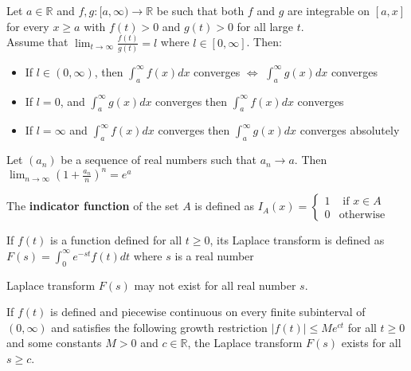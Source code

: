 \begin{prop}
    Let $a \in \mathbb{R}$ and $f,g: [a, \infty) \to \mathbb{R}$ be such that both $f$ and $g$ are integrable on $[a,x]$ for every $x \geq a$ with $f(t) > 0$ and $g(t) > 0$ for all large $t$. \\ Assume that
    $\displaystyle \lim_{t \to \infty} \frac{f(t)}{g(t)} = l$ where $l \in [0, \infty]$. Then:
    \begin{itemize}
        \item If $l \in (0, \infty)$, then $\int_a^\infty f(x)dx$ converges $\iff$ $\int_a^\infty g(x)dx$ converges
        \item If $l = 0$, and $\int_a^\infty g(x)dx$ converges then $\int_a^\infty f(x)dx$ converges
        \item If $l = \infty$ and $\int_a^\infty f(x)dx$ converges then $\int_a^\infty g(x)dx$ converges absolutely
    \end{itemize}
\end{prop}

\begin{prop}
    Let $(a_n)$ be a sequence of real numbers such that $a_n \to a$. Then $\lim_{n \to \infty} \left( 1 + \frac{a_n}{n} \right)^n = e^a$ 
\end{prop}

\begin{defn}
    The \textbf{indicator function} of the set $A$ is defined as $I_A (x) = \begin{cases} 1 & \text{ if } x \in A \\ 0 & \text{otherwise} \end{cases}$

\end{defn}

\begin{defn}
    If $f(t)$ is a function defined for all $t \geq 0$, its Laplace transform is defined as $F(s) = \int_0^\infty e^{-st} f(t) dt$ where $s$ is a real number
\end{defn}

\begin{note}
    Laplace transform $F(s)$ may not exist for all real number $s$.
\end{note}

\begin{thm}
    If $f(t)$ is defined and piecewise continuous on every finite subinterval of $(0, \infty)$ and satisfies the following growth restriction $|f(t)| \leq M e^{ct}$ for all $t \geq 0$ and some constants $M > 0$ and $c \in \mathbb{R}$, the Laplace transform $F(s)$ exists for all $s \geq c$.
\end{thm}

